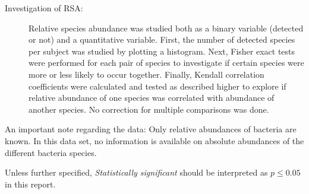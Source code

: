 \begin{description}
    \item[Investigation of RSA: ] Relative species abundance was studied both as a binary variable (detected or not) and a quantitative variable. 
    First, the number of detected species per subject was studied by plotting a histogram. 
    Next, Fisher exact tests were performed for each pair of species to investigate if certain species were more or less likely to occur together. 
    Finally, Kendall correlation coefficients were calculated and tested as described higher to explore if relative abundance of one species was correlated with abundance of another species. 
    No correction for multiple comparisons was done.
\end{description}

An important note regarding the data: Only relative abundances of bacteria are known. 
In this data set, no information is available on absolute abundances of the different bacteria species.

Unless further specified, \textit{Statistically significant} should be interpreted as $p \leq 0.05$ in this report.